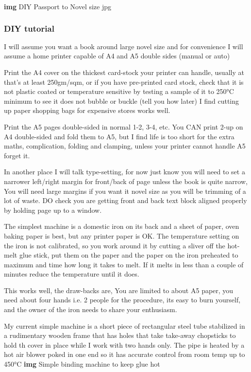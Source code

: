 \documentclass[
]{article}
\begin{document}
\textbf{img} DIY Passport to Novel size jpg

\subsubsection{DIY tutorial}

I will assume you want a book around large novel size and for
convenience I will assume a home printer capable of A4 and A5 double
sides (manual or auto)

Print the A4 cover on the thickest card-stock your printer can handle,
usually at that's at least 250gm/sqm, or if you have pre-printed card
stock, check that it is not plastic coated or temperature sensitive by
testing a sample of it to 250°C minimum to see it does not bubble or
buckle (tell you how later) I find cutting up paper shopping bags for
expensive stores works well.

Print the A5 pages double-sided in normal 1-2, 3-4, etc. You CAN print
2-up on A4 double-sided and fold them to A5, but I find life is too
short for the extra maths, complication, folding and clamping, unless
your printer cannot handle A5 forget it.

In another place I will talk type-setting, for now just know you will
need to set a narrower left/right margin for front/back of page unless
the book is quite narrow, You will need large margins if you want it
novel size as you will be trimming of a lot of waste. DO check you are
getting front and back text block aligned properly by holding page up to
a window.

The simplest machine is a domestic iron on its back and a sheet of
paper, oven baking paper is best, but any printer paper is OK. The
temperature setting on the iron is not calibrated, so you work around it
by cutting a sliver off the hot-melt glue stick, put them on the paper
and the paper on the iron preheated to maximum and time how long it
takes to melt. If it melts in less than a couple of minutes reduce the
temperature until it does.

This works well, the draw-backs are, You are limited to about A5 paper,
you need about four hands i.e. 2 people for the procedure, its easy to
burn yourself, and the owner of the iron needs to share your enthusiasm.

My current simple machine is a short piece of rectangular steel tube
stabilized in a rudimentary wooden frame that has holes that take
take-away chopsticks to hold th cover in place while I work with two
hands only. The pipe is heated by a hot air blower poked in one end so
it has accurate control from room temp up to 450°C \textbf{img} Simple
binding machine to keep glue hot
\end{document}
